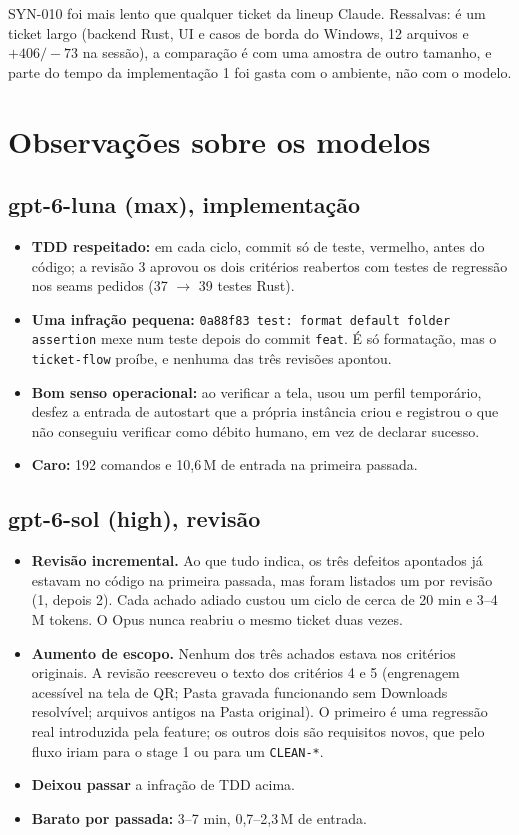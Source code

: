 \documentclass[11pt,a4paper]{article}
\begin{document}
\medskip
SYN-010 foi mais lento que qualquer ticket da lineup Claude. Ressalvas: é um
ticket largo (backend Rust, UI e casos de borda do Windows, 12 arquivos e
$+406/-73$ na sessão), a comparação é com uma amostra de outro tamanho, e parte
do tempo da implementação 1 foi gasta com o ambiente, não com o modelo.

\section{Observações sobre os modelos}

\subsection*{gpt-6-luna (max), implementação}
\begin{itemize}
  \item \textbf{TDD respeitado:} em cada ciclo, commit só de teste, vermelho,
        antes do código; a revisão 3 aprovou os dois critérios reabertos com
        testes de regressão nos seams pedidos (37 $\rightarrow$ 39 testes Rust).
  \item \textbf{Uma infração pequena:} \texttt{0a88f83 test: format default
        folder assertion} mexe num teste depois do commit \texttt{feat}. É só
        formatação, mas o \texttt{ticket-flow} proíbe, e nenhuma das três
        revisões apontou.
  \item \textbf{Bom senso operacional:} ao verificar a tela, usou um perfil
        temporário, desfez a entrada de autostart que a própria instância criou
        e registrou o que não conseguiu verificar como débito humano, em vez de
        declarar sucesso.
  \item \textbf{Caro:} 192 comandos e 10,6\,M de entrada na primeira passada.
\end{itemize}

\subsection*{gpt-6-sol (high), revisão}
\begin{itemize}
  \item \textbf{Revisão incremental.} Ao que tudo indica, os três defeitos apontados já estavam no
        código na primeira passada, mas foram listados um por revisão (1, depois
        2). Cada achado adiado custou um ciclo de cerca de 20 min e 3--4\,M
        tokens. O Opus nunca reabriu o mesmo ticket duas vezes.
  \item \textbf{Aumento de escopo.} Nenhum dos três achados estava nos
        critérios originais. A revisão reescreveu o texto dos critérios 4 e 5
        (engrenagem acessível na tela de QR; Pasta gravada funcionando sem
        Downloads resolvível; arquivos antigos na Pasta original). O primeiro é
        uma regressão real introduzida pela feature; os outros dois são
        requisitos novos, que pelo fluxo iriam para o stage 1 ou para um
        \texttt{CLEAN-*}.
  \item \textbf{Deixou passar} a infração de TDD acima.
  \item \textbf{Barato por passada:} 3--7 min, 0,7--2,3\,M de entrada.
\end{itemize}
\end{document}
